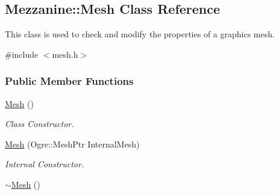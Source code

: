 \hypertarget{classMezzanine_1_1Mesh}{
\subsection{Mezzanine::Mesh Class Reference}
\label{classMezzanine_1_1Mesh}
}


This class is used to check and modify the properties of a graphics mesh.  




{\ttfamily \#include $<$mesh.h$>$}

\subsubsection*{Public Member Functions}
\begin{DoxyCompactItemize}
\item 
\hypertarget{classMezzanine_1_1Mesh_ae27e49d18855b085a4b723b91026ec9b}{
\hyperlink{classMezzanine_1_1Mesh_ae27e49d18855b085a4b723b91026ec9b}{Mesh} ()}
\label{classMezzanine_1_1Mesh_ae27e49d18855b085a4b723b91026ec9b}

\begin{DoxyCompactList}\small\item\em Class Constructor. \item\end{DoxyCompactList}\item 
\hyperlink{classMezzanine_1_1Mesh_a7f93137e60133fa0d35e83946adb5962}{Mesh} (Ogre::MeshPtr InternalMesh)
\begin{DoxyCompactList}\small\item\em Internal Constructor. \item\end{DoxyCompactList}\item 
\hypertarget{classMezzanine_1_1Mesh_abaa019546b348487f6c703f366ebefa6}{
\hyperlink{classMezzanine_1_1Mesh_abaa019546b348487f6c703f366ebefa6}{$\sim$Mesh} ()}
\label{classMezzanine_1_1Mesh_abaa019546b348487f6c703f366ebefa6}


\end{DoxyCompactItemize}
